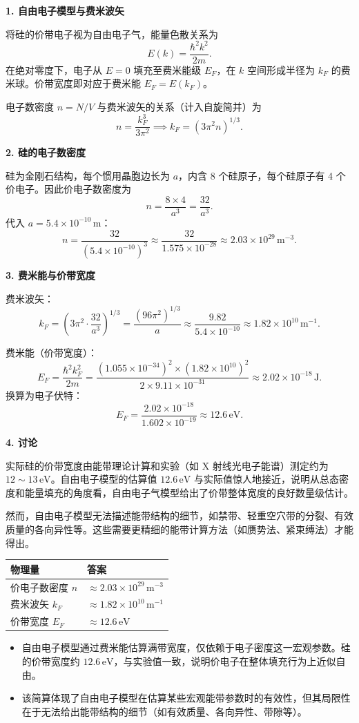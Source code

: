 \begin{derivationbox}[标准解题过程]
\textbf{1. 自由电子模型与费米波矢}

将硅的价带电子视为自由电子气，能量色散关系为
\[
E(k)=\frac{\hbar^2k^2}{2m}.
\]
在绝对零度下，电子从 $E=0$ 填充至费米能级 $E_F$，在 $k$ 空间形成半径为 $k_F$ 的费米球。价带宽度即对应于费米能 $E_F=E(k_F)$。

电子数密度 $n=N/V$ 与费米波矢的关系（计入自旋简并）为
\[
n=\frac{k_F^3}{3\pi^2}
\implies k_F=(3\pi^2n)^{1/3}.
\]

\textbf{2. 硅的电子数密度}

硅为金刚石结构，每个惯用晶胞边长为 $a$，内含 8 个硅原子，每个硅原子有 4 个价电子。因此价电子数密度为
\[
n=\frac{8\times4}{a^3}=\frac{32}{a^3}.
\]
代入 $a=5.4\times10^{-10}\,\text{m}$：
\[
n=\frac{32}{(5.4\times10^{-10})^3}\approx\frac{32}{1.575\times10^{-28}}\approx2.03\times10^{29}\,\text{m}^{-3}.
\]

\textbf{3. 费米能与价带宽度}

费米波矢：
\[
k_F=\left(3\pi^2\cdot\frac{32}{a^3}\right)^{1/3}=\frac{(96\pi^2)^{1/3}}{a}\approx\frac{9.82}{5.4\times10^{-10}}\approx1.82\times10^{10}\,\text{m}^{-1}.
\]

费米能（价带宽度）：
\[
E_F=\frac{\hbar^2k_F^2}{2m}=\frac{(1.055\times10^{-34})^2\times(1.82\times10^{10})^2}{2\times9.11\times10^{-31}}\approx2.02\times10^{-18}\,\text{J}.
\]
换算为电子伏特：
\begin{equation}
\boxed{E_F=\frac{2.02\times10^{-18}}{1.602\times10^{-19}}\approx12.6\,\text{eV}.}
\end{equation}

\textbf{4. 讨论}

实际硅的价带宽度由能带理论计算和实验（如 X 射线光电子能谱）测定约为 $12\sim13\,\text{eV}$。自由电子模型的估算值 $12.6\,\text{eV}$ 与实际值惊人地接近，说明从总态密度和能量填充的角度看，自由电子气模型给出了价带整体宽度的良好数量级估计。

然而，自由电子模型无法描述能带结构的细节，如禁带、轻重空穴带的分裂、有效质量的各向异性等。这些需要更精细的能带计算方法（如赝势法、紧束缚法）才能得出。
\end{derivationbox}

\begin{formulabox}[答案汇总]
\begin{center}
\begin{tabular}{ll}
\toprule
\textbf{物理量} & \textbf{答案} \\
\midrule
价电子数密度 $n$ & $\approx2.03\times10^{29}\,\text{m}^{-3}$ \\
费米波矢 $k_F$ & $\approx1.82\times10^{10}\,\text{m}^{-1}$ \\
价带宽度 $E_F$ & $\approx12.6\,\text{eV}$ \\
\bottomrule
\end{tabular}
\end{center}
\end{formulabox}

\begin{insightbox}[物理图像]
\begin{itemize}
    \item 自由电子模型通过费米能估算满带宽度，仅依赖于电子密度这一宏观参数。硅的价带宽度约 $12.6\,\text{eV}$，与实验值一致，说明价电子在整体填充行为上近似自由。
    \item 该简算体现了自由电子模型在估算某些宏观能带参数时的有效性，但其局限性在于无法给出能带结构的细节（如有效质量、各向异性、带隙等）。
\end{itemize}
\end{insightbox}
